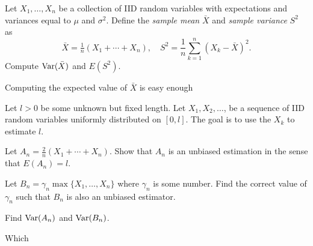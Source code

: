 \begin{problem}
  Let \(X_1,\dotsc,X_n\) be a collection of IID random variables with
  expectations and variances equal to \(\mu\) and \(\sigma^2\). Define the
  \emph{sample mean} \(\bar X\) and \emph{sample variance} \(S^2\) as
  \[
    \bar X=\tfrac{1}{n}(X_1+\dotsb+X_n),\quad
    S^2=\frac{1}{n}\sum_{k=1}^n(X_k-\bar X)^2.
  \]
  Compute \(\operatorname{Var}(\bar X)\) and \(E(S^2)\).
\end{problem}
\begin{solution*}
  Computing the expected value of \(\bar X\) is easy enough
\end{solution*}

\begin{problem}
  Let \(l>0\) be some unknown but fixed length. Let \(X_1,X_2,\dotsc\), be
  a sequence of IID random variables uniformly distributed on
  \([0,l]\). The goal is to use the \(X_k\) to estimate \(l\).
  \begin{alphlist}
  \item Let \(A_n=\tfrac{2}{n}(X_1+\dotsb+X_n).\) Show that \(A_n\) is an
    unbiased estimation in the sense that \(E(A_n)=l\).
  \item Let \(B_n=\gamma_n\max\{X_1,\dotsc,X_n\}\) where \(\gamma_n\) is
    some number. Find the correct value of \(\gamma_n\) such that \(B_n\)
    is also an unbiased estimator.
  \item Find \(\operatorname{Var}(A_n)\) and \(\operatorname{Var}(B_n)\).
  \item Which
  \end{alphlist}
\end{problem}
\begin{solution*}
\end{solution*}

